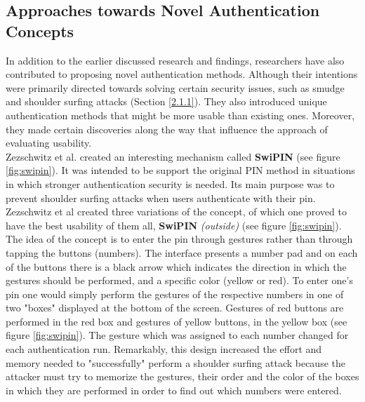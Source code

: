 \subsection{Approaches towards Novel Authentication Concepts}

In addition to the earlier discussed research and findings, researchers have also contributed to proposing novel authentication methods. Although their intentions were primarily directed towards solving certain security issues, such as smudge and shoulder surfing attacks (Section \ref{2.1.1}). They also introduced unique authentication methods that might be more usable than existing ones. Moreover, they made certain discoveries along the way that influence the approach of evaluating usability.\\

Zezschwitz et al. \cite{Swipin} created an interesting mechanism called \textbf{SwiPIN} (see figure \ref{fig:swipin}). It was intended to be support the original PIN method in situations in which stronger authentication security is needed. Its main purpose was to prevent shoulder surfing attacks when users authenticate with their pin. Zezschwitz et al \cite{Swipin} created three variations of the concept, of which one proved to have the best usability of them all, \textbf{SwiPIN} \textit{(outside)} (see figure \ref{fig:swipin}). The idea of the concept is to enter the pin through gestures rather than through tapping the buttons (numbers). The interface presents a number pad and on each of the buttons there is a black arrow which indicates the direction in which the gestures should be performed, and a specific color (yellow or red). To enter one's pin one would simply perform the gestures of the respective numbers in one of two "boxes" displayed at the bottom of the screen. Gestures of red buttons are performed in the red box and gestures of yellow buttons, in the yellow box (see figure \ref{fig:swipin}). The gesture which was assigned to each number changed for each authentication run. Remarkably, this design increased the effort and memory needed to "successfully" perform a shoulder surfing attack because the attacker must try to memorize the gestures, their order and the color of the boxes in which they are performed in order to find out which numbers were entered. \\

